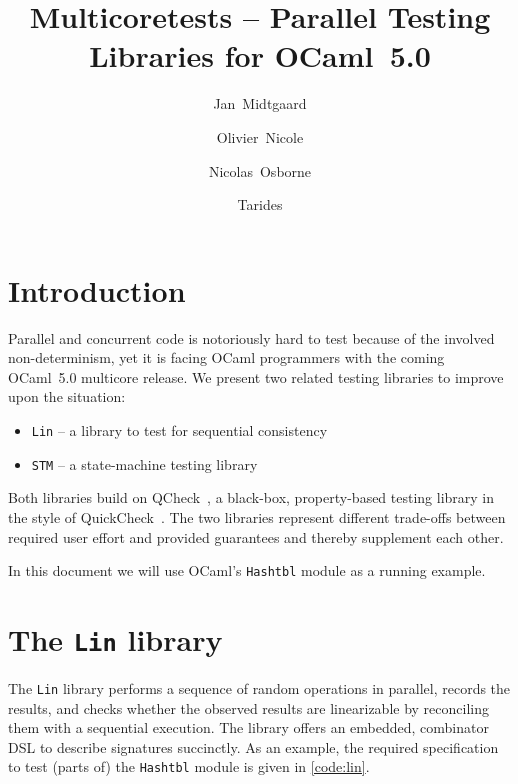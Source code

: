 \documentclass[twocolumn,10pt]{article}
\title{Multicoretests -- Parallel Testing Libraries for OCaml~5.0}
\author{Jan~Midtgaard \and Olivier~Nicole \and Nicolas~Osborne}
\date{Tarides} %
\begin{document}
\maketitle

\section{Introduction}

Parallel and concurrent code is notoriously hard to test because of
the involved non-determinism, yet it is facing OCaml programmers with
the coming OCaml~5.0 multicore release. We present two related testing
libraries to improve upon the situation:
\begin{itemize}
  \tightlist
  \item \texttt{Lin} -- a library to test for sequential consistency
  \item \texttt{STM} -- a state-machine testing library
\end{itemize}
Both libraries build on QCheck~\cite{QCheck}, a black-box, property-based
testing library in the style of
QuickCheck~\cite{claessenQuickCheckLightweightTool2000}.
The two libraries represent different trade-offs between required user effort
and provided guarantees and thereby supplement each other.

In this document we will use OCaml's \texttt{Hashtbl} module as a running
example.


\section{The \texttt{Lin} library}

The \texttt{Lin} library performs a sequence of random operations in
parallel, records the results, and checks whether the observed results
are linearizable by reconciling them with a sequential execution.
%
The library offers an embedded, combinator DSL to describe signatures
succinctly. As an example, the required specification to test (parts
of) the \texttt{Hashtbl} module is given in \cref{code:lin}.
\end{document}
